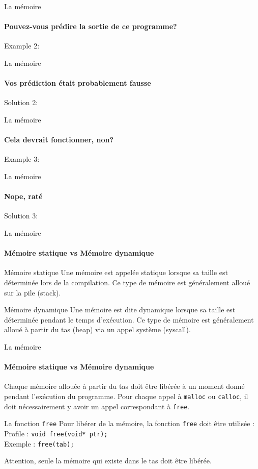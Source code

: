 \documentclass{beamer}
\begin{document}
\begin{darkframes}
  	\begin{frame}{La mémoire}
  		\framesubtitle{Pouvez-vous prédire la sortie de ce programme?}
  		Example 2:
  		\dataDemoTwo
  	\end{frame}
  	\begin{frame}{La mémoire}
  		\framesubtitle{Vos prédiction était probablement fausse}
  		Solution 2:
  		\dataDemoTwoSolution
  	\end{frame}
  
  	\begin{frame}{La mémoire}
  		\framesubtitle{Cela devrait fonctionner, non?}
  		Example 3:
  		\dataDemoThree
  	\end{frame}
  	
  	\begin{frame}{La mémoire}
  		\framesubtitle{Nope, raté}
  		Solution 3:
  		\dataDemoThreeSolution
  	\end{frame}
   	
  	\begin{frame}{La mémoire}
  		\framesubtitle{Mémoire statique vs Mémoire dynamique}
  		\begin{block}{Mémoire statique}
  			Une mémoire est appelée \alert{statique } lorsque sa taille est déterminée lors de la \alert{compilation}. Ce type de mémoire est généralement alloué sur la \alert{pile} (stack).
  		\end{block}
  		\begin{block}{Mémoire dynamique}
  			Une mémoire est dite \alert{dynamique} lorsque sa taille est déterminée pendant le temps \alert{d'exécution}. Ce type de mémoire est généralement alloué à partir du \alert{tas} (heap) via un appel système (syscall).
  		\end{block}
  	\end{frame} 	

  	\begin{frame}{La mémoire}
  		\framesubtitle{Mémoire statique vs Mémoire dynamique}
  		\begin{alertblock}{
  			Chaque mémoire allouée à partir du tas doit être libérée à un moment donné pendant l'exécution du programme. Pour chaque appel à \texttt{malloc} ou \texttt{calloc}, il doit nécessairement y avoir un appel correspondant à \texttt{free}.}
  		\end{alertblock}
  		\begin{block}{La fonction \texttt{free}}
  			Pour libérer de la mémoire, la fonction \texttt{free} doit être utilisée :
  			\alert{Profile} : \texttt{void free(void* ptr);} \\
  			Exemple : \texttt{free(tab);}
  		\end{block}
  		\begin{alertblock}{Attention, seule la mémoire qui existe dans le tas doit être libérée.}
  		\end{alertblock}
  	\end{frame}
  

\end{darkframes}
\end{document}
